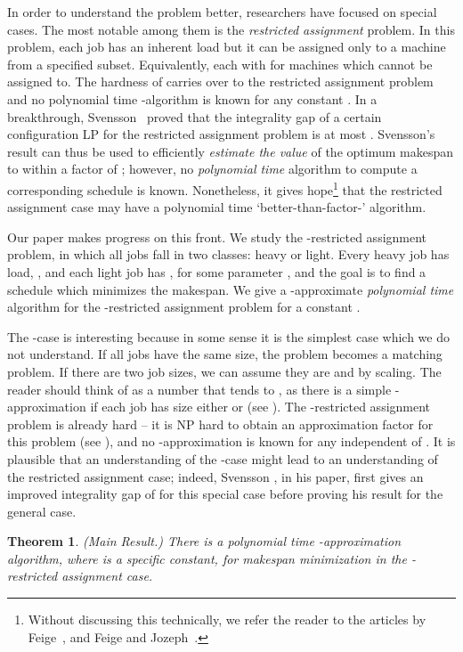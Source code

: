 \documentclass[11pt]{article}
\newtheorem{theorem}{Theorem} \newtheorem{lemma}{Lemma}[section]
\begin{document}
In order to understand the problem better, researchers have focused on special cases. 
The most notable among them is the {\em restricted assignment} problem. In this problem, each job  has an inherent load  but it can be assigned only to a machine  from a specified subset. Equivalently, each  with  for machines  which  cannot be assigned to.
 The hardness of  carries over to the restricted assignment problem and no  polynomial time -algorithm is known for any constant .
In a breakthrough, Svensson~\cite{Sve11} proved that the integrality gap of a certain configuration LP for the restricted assignment problem is at most  .  Svensson's result can thus be used to efficiently {\em estimate the value} of the optimum makespan to within a factor of ; however, no {\em polynomial time} algorithm to compute a corresponding schedule is known. Nonetheless, it gives hope\footnote{Without discussing this technically, we refer the reader to the articles by Feige~\cite{F08}, and Feige and Jozeph~\cite{FJ14}.} that the restricted assignment case may have a polynomial time `better-than-factor-' algorithm. 

Our paper makes progress on this front.  We study the -restricted assignment problem, in which 
all jobs fall in two classes: heavy or light. Every heavy job has load, , and each light job has , for some parameter , and the goal is to find a schedule which minimizes the makespan.
We give a -approximate \emph{polynomial time} algorithm for the -restricted assignment problem for a constant .



The -case is interesting because in some sense it is the simplest case which we do not understand. If all jobs have the same size, the problem becomes a matching problem. If there are two job sizes, we can assume they are  and  by scaling. The reader should think of  as a number that tends to , as there is a simple -approximation if each job has size either  or  (see ).  The -restricted assignment problem is already hard -- it is NP hard to obtain an approximation factor  for this problem (see ), and no -approximation is known for any  independent of .  It is plausible that an understanding of the -case might lead to an understanding of  the restricted assignment case; indeed,
Svensson \cite{Sve11}, in his paper, first gives an improved integrality gap of  for this special case before proving  his result for the general case. 


\begin{theorem}(Main Result.)
\label{thm:main}
 There is a polynomial time -approximation algorithm, where  is a specific constant,  for makespan minimization in the -restricted assignment case.
\end{theorem}
\end{document}
